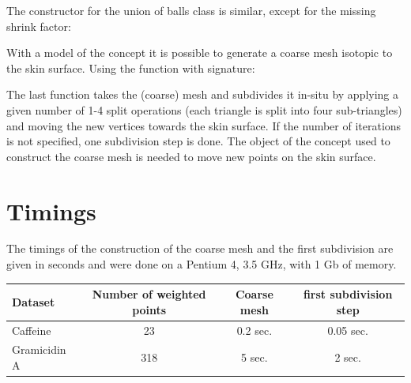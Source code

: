 
The constructor for the union of balls class is similar, except for
the missing shrink factor:



With a model of the concept  it is possible to
generate a coarse mesh isotopic to the skin surface. Using the
function  with signature:


The last function takes the (coarse) mesh and subdivides it in-situ by
applying a given number of 1-4 split operations (each triangle is
split into four sub-triangles) and moving the new vertices towards the
skin surface. If the number of iterations is not specified, one
subdivision step is done. The object of the 
concept used to construct the coarse mesh is needed to move new points
on the skin surface.


%

\section{Timings}
The timings of the construction of the coarse mesh and the first
subdivision are given in seconds and were done on a Pentium 4, 3.5
GHz, with 1 Gb of memory.
\begin{center}
  \begin{tabular}{|l|c|c|c|}
    \hline
    Dataset & Number of weighted points & Coarse mesh & first subdivision step\\
    \hline
    \hline
    Caffeine& 23 & 0.2 sec. & 0.05 sec.\\
    Gramicidin A& 318 & 5 sec. & 2 sec.\\
    \hline
  \end{tabular}
\end{center}

